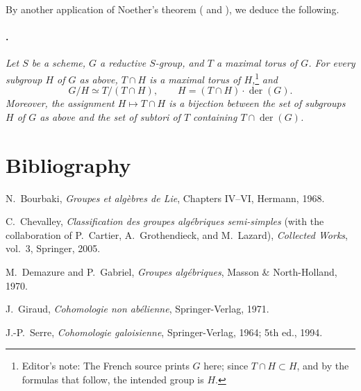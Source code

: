 By another application of Noether's theorem \textup{( and )}, we deduce the following.

\paragraph{.}
\textit{Let \(S\) be a scheme, \(G\) a reductive \(S\)-group, and
\(T\) a maximal torus of \(G\). For every subgroup \(H\) of \(G\)
as above, \(T\cap H\) is a maximal torus of
\(H\),}\footnote{Editor's note: The French source prints \(G\)
here; since \(T\cap H\subset H\), and by the formulas that follow,
the intended group is \(H\).}
\textit{and}
\[
  G/H\simeq T/(T\cap H),
  \qquad
  H=(T\cap H)\cdot\operatorname{der}(G).
\]
\textit{Moreover, the assignment \(H\mapsto T\cap H\) is a
bijection between the set of subgroups \(H\) of \(G\) as above
and the set of subtori of \(T\) containing
\(T\cap\operatorname{der}(G)\).}

\clearpage
{}
\section*{Bibliography}

\begin{description}
\item[{[BLie]}]
N.~Bourbaki, \emph{Groupes et algèbres de Lie}, Chapters
IV--VI, Hermann, 1968.

\item[{[Ch05]}]
C.~Chevalley, \emph{Classification des groupes algébriques
semi-simples} \textup{(with the collaboration of P.~Cartier,
A.~Grothendieck, and M.~Lazard)}, \emph{Collected Works},
vol.~3, Springer, 2005.

\item[{[DG70]}]
M.~Demazure and P.~Gabriel, \emph{Groupes algébriques},
Masson \& North-Holland, 1970.

\item[{[Gi71]}]
J.~Giraud, \emph{Cohomologie non abélienne},
Springer-Verlag, 1971.

\item[{[Se64]}]
J.-P.~Serre, \emph{Cohomologie galoisienne},
Springer-Verlag, 1964; 5th ed., 1994.
\end{description}



